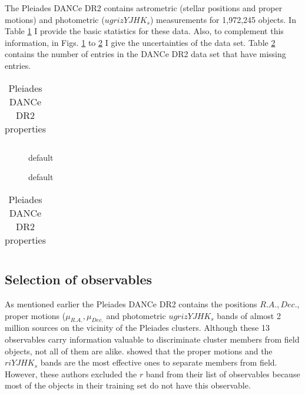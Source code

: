 The Pleiades DANCe DR2 contains astrometric (stellar positions and proper motions) and photometric ($ugrizYJHK_s$) measurements for 1,972,245 objects. In Table \ref{tab:DR2properties} I provide the basic statistics for these data. Also, to complement this information, in Figs. \ref{fig:pmuncert} to \ref{fig:maguncert} I give the uncertainties of the data set. Table \ref{tab:DR2Missing} contains the number of entries in the DANCe DR2 data set that have missing entries.

\begin{table}[htdp]
\caption{Pleiades DANCe DR2 properties}
\begin{center}
\begin{tabular}{|c|c|}

\end{tabular}
\end{center}
\label{tab:DR2properties}
\end{table}%

\begin{figure}[htbp]
\begin{center}
\caption{default}
\label{fig:pmuncert}
\end{center}
\end{figure}

\begin{figure}[htbp]
\begin{center}
\caption{default}
\label{fig:maguncert}
\end{center}
\end{figure}

\begin{table}[htdp]
\caption{Pleiades DANCe DR2 properties}
\begin{center}
\begin{tabular}{|c|c|}

\end{tabular}
\end{center}
\label{tab:DR2Missing}
\end{table}%



\subsection{Selection of observables}
As mentioned earlier the Pleiades DANCe DR2 contains the positions $R.A., Dec.$, proper motions ($\mu_{R.A.},\mu_{Dec.}$ and photometric $ugrizYJHK_s$ bands  of almost 2 million sources on the vicinity of the Pleiades clusters. Although these 13 observables carry information valuable to discriminate cluster members from field objects, not all of them are alike. \citet{Sarro2014} showed that the proper motions and the $riYJHK_s$ bands are the most effective ones to separate members from field. However, these authors excluded the $r$ band from their list of observables because most of the objects in their training set do not have this observable. 

